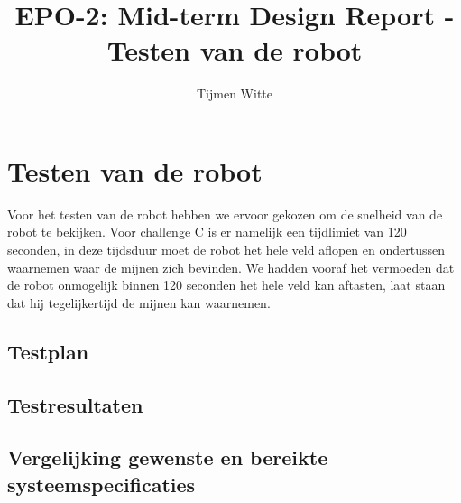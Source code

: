 \documentclass{report}
\title{EPO-2: Mid-term Design Report - Testen van de robot}
\author{Tijmen Witte}
\begin{document}
\chapter{Testen van de robot}

Voor het testen van de robot hebben we ervoor gekozen om de snelheid van de robot te bekijken. Voor challenge C is er namelijk een tijdlimiet van 120 seconden, in deze tijdsduur moet de robot het hele veld aflopen en ondertussen waarnemen waar de mijnen zich bevinden. We hadden vooraf het vermoeden dat de robot onmogelijk binnen 120 seconden het hele veld kan aftasten, laat staan dat hij tegelijkertijd de mijnen kan waarnemen. 

\section{Testplan}


\section{Testresultaten}

\section{Vergelijking gewenste en bereikte systeemspecificaties}
\end{document}
